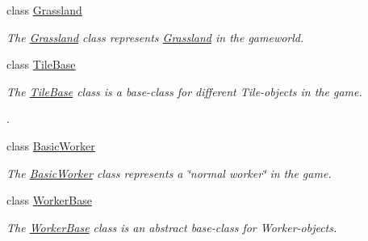\begin{DoxyCompactItemize}
class \hyperlink{classCourse_1_1Grassland}{Grassland}
\begin{DoxyCompactList}\small\item\em The \hyperlink{classCourse_1_1Grassland}{Grassland} class represents \hyperlink{classCourse_1_1Grassland}{Grassland} in the gameworld. \end{DoxyCompactList}\item 
class \hyperlink{classCourse_1_1TileBase}{Tile\-Base}
\begin{DoxyCompactList}\small\item\em The \hyperlink{classCourse_1_1TileBase}{Tile\-Base} class is a base-\/class for different Tile-\/objects in the game. \par
. \end{DoxyCompactList}\item 
class \hyperlink{classCourse_1_1BasicWorker}{Basic\-Worker}
\begin{DoxyCompactList}\small\item\em The \hyperlink{classCourse_1_1BasicWorker}{Basic\-Worker} class represents a \char`\"{}normal worker\char`\"{} in the game. \end{DoxyCompactList}\item 
class \hyperlink{classCourse_1_1WorkerBase}{Worker\-Base}
\begin{DoxyCompactList}\small\item\em The \hyperlink{classCourse_1_1WorkerBase}{Worker\-Base} class is an abstract base-\/class for Worker-\/objects. \end{DoxyCompactList}\end{DoxyCompactItemize}
